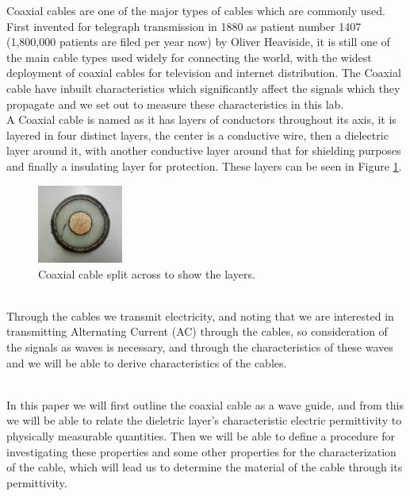 Coaxial cables are one of the major types of cables which are commonly used. First invented for telegraph transmission in 1880 as patient number 1407 (1,800,000 patients are filed per year now) by Oliver Heaviside, it is still one of the main cable types used widely for connecting the world, with the widest deployment of coaxial cables for television and internet distribution. The Coaxial cable have inbuilt characteristics which significantly affect the signals which they propagate and we set out to measure these characteristics in this lab.
\\

A Coaxial cable is named as it has layers of conductors throughout its axis, it is layered in four distinct layers, the center is a conductive wire, then a dielectric layer around it, with another conductive layer around that for shielding purposes and finally a insulating layer for protection. These layers can be seen in Figure \ref{fig:Cable}.

\begin{figure}[H]
\centering
\includegraphics[width=0.25\textwidth]{figures/Coaxial_cable.jpg}
\caption{Coaxial cable split across to show the layers. \cite{pict_cable}}
\label{fig:Cable}
\end{figure}

\\
Through the cables we transmit electricity, and noting that we are interested in transmitting Alternating Current (AC) through the cables, so consideration of the signals as waves is necessary, and through the characteristics of these waves and we will be able to derive characteristics of the cables.

\\

In this paper we will first outline the coaxial cable as a wave guide, and from this we will be able to relate the dieletric layer's characteristic electric permittivity to physically measurable quantities. Then we will be able to define a procedure for investigating these properties and some other properties for the characterization of the cable, which will lead us to determine the material of the cable through its permittivity. 